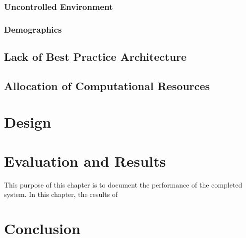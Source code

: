     \subsection{Uncontrolled Environment}
    \subsection{Demographics}
    \section{Lack of Best Practice Architecture}
    \section{Allocation of Computational Resources}
    \chapter{Design}
    \chapter{Evaluation and Results}
    This purpose of this chapter is to document the performance of the completed system.  In this chapter, the results of 
    \chapter{Conclusion}
